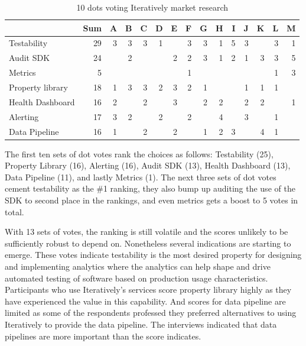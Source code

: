 \begin{table}[htbp!]
 
    \centering
    \small
    \setlength{\tabcolsep}{4pt} %
    \begin{tabular}{lr|rrrrrrrrrrrrr}
                     &Sum &A  &B  &C  &D  &E  &F  &G  &H  &I  &J &K &L &M\\
    \hline     
    Testability         &29 &3  &3  &3  &1  &   &3  &3  &1  &5  &3 &  &3 &1\\
    Audit SDK           &24 &   &2  &   &   &2  &2  &3  &1  &2  &1 &3 &3 &5\\
    Metrics             &5  &   &   &   &   &   &1  &   &   &   &  &  &1 &3\\
    Property library    &18 &1  &3  &3  &2  &3  &2  &1  &   &   &1 &1 &1 & \\
    Health Dashboard    &16 &2  &   &2  &   &3  &   &2  &2  &   &2 &2 &  &1\\
    Alerting            &17 &3  &2  &   &2  &   &2  &   &4  &   &3 &  &1 & \\
    Data Pipeline       &16 &1  &   &2  &   &2  &   &1  &2  &3  &  &4 &1 & \\
         
    \end{tabular}
    \caption{10 dots voting Iteratively market research}
    \label{tab:10dots_voting_iteratively}

\end{table}

The first ten sets of dot votes rank the choices as follows: Testability (25), Property Library (16), Alerting (16), Audit SDK (13), Health Dashboard (13), Data Pipeline (11), and lastly Metrics (1). The next three sets of dot votes cement testability as the \#1 ranking, they also bump up auditing the use of the SDK to second place in the rankings, and even metrics gets a boost to 5 votes in total. 

With 13 sets of votes, the ranking is still volatile and the scores unlikely to be sufficiently robust to depend on. Nonetheless several indications are starting to emerge. 
These votes indicate testability is the most desired property for designing and implementing analytics where the analytics can help shape and drive automated testing of software based on production usage characteristics. Participants who use Iteratively's services score property library highly as they have experienced the value in this capability. And scores for data pipeline are limited as some of the respondents professed they preferred alternatives to using Iteratively to provide the data pipeline. The interviews indicated that data pipelines are more important than the score indicates.

